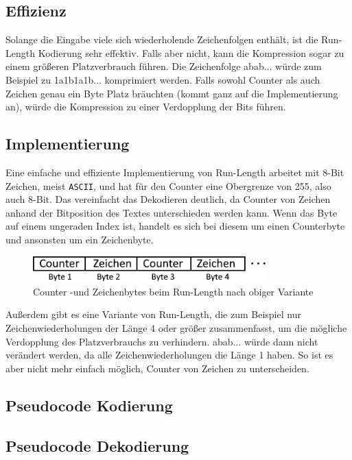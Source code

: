 \documentclass{article}
\begin{document}
\subsection{Effizienz}
Solange die Eingabe viele sich wiederholende Zeichenfolgen enthält, ist die Run-Length 
Kodierung sehr effektiv. Falls aber nicht, kann die Kompression sogar zu einem größeren 
Platzverbrauch führen. 
Die Zeichenfolge \textsf{abab}$\dots$ würde zum Beispiel zu \textsf{1a1b1a1b}$\dots$ komprimiert werden. 
Falls sowohl Counter als auch Zeichen genau ein Byte Platz bräuchten (kommt ganz auf die
Implementierung an), würde die Kompression zu einer Verdopplung der Bits führen.
\subsection{Implementierung}
Eine einfache und effiziente Implementierung von Run-Length arbeitet mit 8-Bit Zeichen, meist \texttt{ASCII},
und hat für den Counter eine Obergrenze von 255, also auch 8-Bit. Das vereinfacht das 
Dekodieren deutlich, da Counter von Zeichen anhand der Bitposition des Textes unterschieden
werden kann. Wenn das Byte auf einem ungeraden Index ist, handelt es sich bei diesem 
um einen Counterbyte und ansonsten um ein Zeichenbyte.
\begin{figure}[H]
    \centering
    \includegraphics*[width=0.8\textwidth]{images/bytesteps.png}
    \caption[Counter -und Zeichenbytes beim Run-Length]{
        Counter -und Zeichenbytes beim Run-Length nach obiger Variante
    }
\end{figure}

Außerdem gibt es eine Variante von Run-Length, die zum Beispiel nur Zeichenwiederholungen der Länge 4 oder größer 
zusammenfasst, um die mögliche Verdopplung des Platzverbrauchs zu verhindern. 
\textsf{abab}$\dots$ würde dann nicht verändert werden, da alle Zeichenwiederholungen die Länge 1 haben.
So ist es aber nicht mehr einfach möglich, Counter von Zeichen zu unterscheiden.
\subsection{Pseudocode Kodierung}

\subsection{Pseudocode Dekodierung}

\newpage
\end{document}
